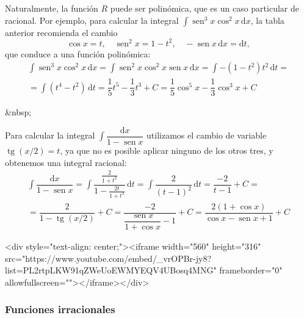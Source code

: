 \begin{ejemplo}
Naturalmente, la función $R$ puede ser polinómica, que es un caso particular de racional.
Por ejemplo, para calcular la integral $\displaystyle\int\operatorname{sen}^3 x\cos^2 x\,\mathrm dx$, la tabla anterior recomienda el cambio
\[
\cos x = t,\quad \operatorname{sen}^2 x=1-t^2,\quad -\operatorname{sen} x\,\mathrm dx=\mathrm dt,
\]
que conduce a una función polinómica:
\begin{multline*}
\displaystyle\int\operatorname{sen}^3 x\cos^2 x\,\mathrm dx =
\displaystyle\int\operatorname{sen}^2 x\cos^2 x\operatorname{sen} x\,\mathrm dx = 
\displaystyle\int -(1-t^2)t^2\,\mathrm dt =\\
= \displaystyle\int(t^4-t^2)\,\mathrm dt = \dfrac{1}{5}t^5-\dfrac{1}{3}t^3+C
= \dfrac{1}{5}\cos^5x -\dfrac{1}{3}\cos^3x + C\tag*{\fej}
\end{multline*}
\end{ejemplo}
\begin{rawhtml}
&nbsp;
\end{rawhtml}
\begin{ejemplo}
Para calcular la integral $\displaystyle\int\dfrac{\mathrm dx}{1-\operatorname{sen} x}$ utilizamos el cambio de variable $\operatorname{tg}(x/2)=t$, ya que no es posible aplicar ninguno de los otros tres, y obtenemos una integral racional:
\begin{multline*}
\displaystyle\int\dfrac{\mathrm dx}{1-\operatorname{sen} x} = \displaystyle\int\dfrac{\frac{2}{1+t^2}}{1-\frac{2t}{1+t^2}}\,\mathrm dt = \displaystyle\int\dfrac{2}{(t-1)^2}\,\mathrm dt = \dfrac{-2}{t-1}+C=\\
= \dfrac{2}{1-\operatorname{tg}(x/2)} + C
= \dfrac{-2}{\dfrac{\operatorname{sen} x}{1+\cos x}-1} + C
= \dfrac{2(1+\cos x)}{\cos x -\operatorname{sen} x+1} + C\tag*{\fej}
\end{multline*}
\end{ejemplo}

\begin{rawhtml}
<div style="text-align: center;"><iframe width="560" height="316" src="https://www.youtube.com/embed/_vrOPBr-jy8?list=PL2rtpLKW91qZWeUoEWMYEQV4UBosq4MNG" frameborder="0" allowfullscreen=""></iframe></div>
\end{rawhtml}

\subsubsection{Funciones irracionales}\label{irrac}

